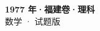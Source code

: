 \documentclass[zihao=-4, a4paper]{ctexart}
\begin{document}
\begin{center}
  {\Large\bfseries 1977 年·福建卷·理科}\\[4pt]
  {\large 数学 · 试题版}
\end{center}
\medskip
{}

\end{document}

